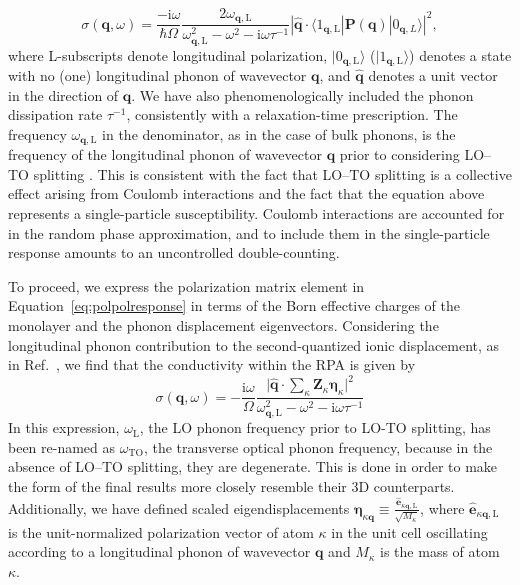 \documentclass[aps,prb,twocolumn,
	           groupedaddress,superscriptaddress,
               amsfonts,amssymb,amsmath,floatfix,
	           citeautoscript]{revtex4-1}
\newcommand{\iu}{\mathrm{i}}
\begin{document}
\begin{equation}
    \sigma(\mathbf{q},\omega) = \frac{-\iu\omega}{\hbar\Omega} \frac{2\omega_{\mathbf{q},\mathrm{L}}}{\omega^2_{\mathbf{q},\mathrm{L}}-\omega^2-\iu\omega\tau^{-1}}|\hat{\mathbf{q}}\cdot\langle 1_{\mathbf{q},\mathrm{L}}|\mathbf{P}(\mathbf{q})|0_{\mathbf{q},L}\rangle|^2,
    \label{eq:polpolresponse}
\end{equation}
where L-subscripts denote longitudinal polarization, $|0_{\mathbf{q},\mathrm{L}}\rangle$ ($|1_{\mathbf{q},\mathrm{L}}\rangle$) denotes a state with no (one) longitudinal phonon of wavevector $\mathbf{q}$, and $\hat{\mathbf{q}}$ denotes a unit vector in the direction of $\mathbf{q}$. We have also phenomenologically included the phonon dissipation rate $\tau^{-1}$, consistently with  a relaxation-time prescription.  The frequency $\omega_{\mathbf{q},\mathrm{L}}$ in the denominator, as in the case of bulk phonons, is the frequency of the longitudinal phonon of wavevector $\mathbf{q}$ prior to considering LO--TO splitting \cite{BornHuang:1954}.
This is consistent with the fact that LO--TO splitting is a collective effect arising from Coulomb interactions and the fact that the equation above represents a single-particle susceptibility. Coulomb interactions are accounted for in the random phase approximation, and to include them in the single-particle response amounts to an uncontrolled double-counting. 


To proceed, we express the polarization matrix element in Equation~\eqref{eq:polpolresponse} in terms of the Born effective charges of the monolayer and the phonon displacement eigenvectors. Considering the longitudinal phonon contribution to the second-quantized ionic displacement, as in Ref.~, we find that the conductivity within the RPA is given by
\begin{equation}
    \sigma(\mathbf{q},\omega) = -\frac{\iu\omega }{\Omega}\frac{\Big|\hat{\mathbf{q}}\cdot\sum\limits_{\kappa}\mathbf{Z}_{\kappa}\boldsymbol{\eta}_{\kappa} \Big|^2}{\omega^2_{\mathbf{q},\mathrm{L}}-\omega^2-\iu\omega\tau^{-1}}
    \label{eq:conductivity_simplified}
\end{equation}
  In this expression, $\omega_\mathrm{L}$, the LO phonon frequency prior to LO-TO splitting, has been re-named as $\omega_{\mathrm{TO}}$, the transverse optical phonon frequency, because in the absence of LO--TO splitting, they are degenerate. This is done in order to make the form of the final results more closely resemble their 3D counterparts. 
Additionally, we have defined scaled eigendisplacements $\boldsymbol{\eta}_{\kappa\mathbf{q}}\equiv \frac{\hat{\mathbf{e}}_{\kappa\mathbf{q},\mathrm{L}}}{\sqrt{M_{\kappa}}}$, where $\hat{\mathbf{e}}_{\kappa\mathbf{q},\mathrm{L}}$ is the unit-normalized polarization vector of atom $\kappa$ in the unit cell oscillating according to a longitudinal phonon of wavevector $\mathbf{q}$ and $M_{\kappa}$ is the mass of atom $\kappa$. 
\end{document}
